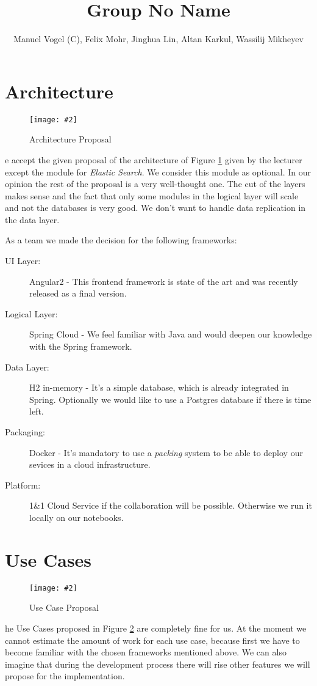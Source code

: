 \documentclass[]{article}
\title{Group \textbf{No Name}}
\author{Manuel Vogel (C), Felix Mohr,  Jinghua Lin,  Altan Karkul, Wassilij Mikheyev}
\newcommand{\cgraphic}[4]
{
	\begin{figure}[htb]
		\begin{center}
		\texttt{[image: \#2]}
		\end{center}
		\caption{#3}
		\label{fig:#2}
	\end{figure}
}%
\begin{document}
	
	\maketitle	

	\section{Architecture}
	\cgraphic{.17}{architecture_proposal}{Architecture Proposal}
	We accept the given proposal of the architecture of Figure \ref{fig:architecture_proposal} given by the lecturer except the module for \textit{Elastic Search}. We consider this module as optional. In our opinion the rest of the proposal is a very well-thought one. The cut of the layers makes sense and the fact that only some modules in the logical layer will scale and not the databases is very good. We don't want to handle data replication in the data layer. 
	
	As a team we made the decision for the following frameworks:
	\begin{description}
		\item[UI Layer:] Angular2 - This frontend framework is state of the art and was recently released as a final version. 
		\item[Logical Layer:] Spring Cloud - We feel familiar with Java and would deepen our knowledge with the Spring framework.
		\item[Data Layer:] H2 in-memory - It's a simple database, which is already integrated in Spring. Optionally we would like to use a Postgres database if there is time left.
		\item[Packaging:] Docker - It's mandatory to use a \textit{packing} system to be able to deploy our sevices in a cloud infrastructure.
		\item[Platform:] 1\&1 Cloud Service if the collaboration will be possible. Otherwise we run it locally on our notebooks.
	\end{description}

	\section{Use Cases}
	\cgraphic{.16}{use_cases_proposal}{Use Case Proposal}
	The Use Cases proposed in Figure \ref{fig:use_cases_proposal} are completely fine for us. At the moment we cannot estimate the amount of work for each use case, because first we have to become familiar with the chosen frameworks mentioned above. We can also imagine that during the development process there will rise other features we will propose for the implementation.
	
\end{document}
